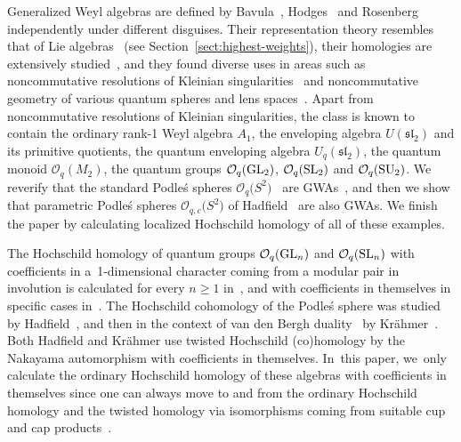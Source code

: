 \documentclass[10pt,a4paper]{amsart}
\newcommand{\G}[1]{\mathfrak{#1}}
\newcommand{\C}[1]{\mathcal{#1}}
\renewcommand{\geq}{\geqslant}
\numberwithin{equation}{section}
\begin{document}
Generalized Weyl algebras are defined by Bavula~\cite{Bavula:GWAI, Bavula:GlobalDim},
Hodges~\cite{Hodges:NCDeformations} and Rosenberg~\cite{Rosenber:NCAlgebraicGeometry} independently
under different disguises. Their representation theory resembles that of Lie
algebras~\cite{DGO:WeightModules, Meinel:DufloTheorem} (see Section~\ref{sect:highest-weights}),
their homologies are extensively studied~\cite{FarinatiSolotarAlvarez:GeneralizedWeyAlgebras, Liu:HomologicalSmoothnessI,
 Liu:HomologicalSmoothnessII,
 SolotarAlvarezVivas:QuantumGeneralizedWeyl}, and they found diverse uses in areas such as noncommutative
resolutions of Kleinian
singularities~\cite{Boddington:ResolutionOfTypeD,crawley-boevey1998,Levy:2009} and noncommutative
geometry of various quantum spheres and lens spaces~\cite{Brzezinski:GWAs}. Apart from
noncommutative resolutions of Kleinian singularities, the class is known to contain the ordinary
rank-1 Weyl algebra $A_1$, the enveloping algebra $U(\G{sl}_2)$ and its primitive quotients, the
quantum enveloping algebra $U_q(\G{sl}_2)$, the quantum monoid $\C{O}_q(M_2)$, the quantum groups
$\C{O}_q({\rm GL}_2)$, $\C{O}_q({\rm SL}_2)$ and $\C{O}_q({\rm SU}_2)$. We reverify that the standard Podle\'s spheres
$\C{O}_q\bigl(S^2\bigr)$~\cite{Podl87} are GWAs~\cite{Liu:HomologicalSmoothnessI}, and then we show that
parametric Podle\'s spheres $\C{O}_{q,c}\bigl(S^2\bigr)$ of Hadfield~\cite{Hadfield:Podles} are also GWAs. We
finish the paper by calculating localized Hochschild homology of all of these examples.

The Hochschild homology of quantum groups $\C{O}_q({\rm GL}_n)$ and $\C{O}_q({\rm SL}_n)$ with coefficients in a~1-dimensional character coming from a modular pair in involution is calculated for every $n\geq 1$
in~\cite{KaygunSutlu:HomologyOfQuantumLinearGroups}, and with coefficients in themselves in specific
cases in~\cite{HadfKrah05, HadfKrae06, MasuNakaWata90, Ross90}. The Hochschild cohomology of the
Podle\'s sphere was studied by Hadfield~\cite{Hadfield:Podles}, and then in the context of van den
Bergh duality~\cite{vdBer98, VanDenBergh:HochschildPoicareDualityErratum} by Kr\"ahmer~\cite{Krah08}.
Both Hadfield and Kr\"ahmer use twisted Hochschild (co)homology by the Nakayama automorphism with
coefficients in themselves. In~this paper, we~only calculate the ordinary Hochschild homology of
these algebras with coefficients in themselves since one can always move to and from the ordinary
Hochschild homology and the twisted homology via isomorphisms coming from suitable cup and cap
products~\cite{GoodKrah14,Krah08}.
\end{document}
